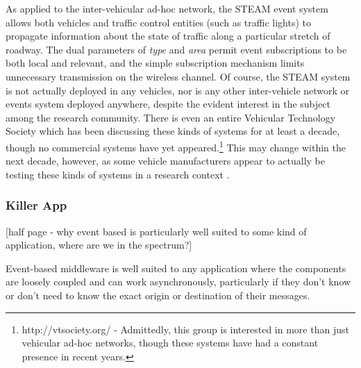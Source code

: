 \documentclass{acm_proc_article-sp}
\begin{document}
As applied to the inter-vehicular ad-hoc network, the STEAM event system allows both vehicles and traffic control entities (such as traffic lights) to propagate information about the state of traffic along a particular stretch of roadway. The dual parameters of {\em type} and {\em area} permit event subscriptions to be both local and relevant, and the simple subscription mechanism limits unnecessary transmission on the wireless channel. Of course, the STEAM system is not actually deployed in any vehicles, nor is any other inter-vehicle network or events system deployed anywhere, despite the evident interest in the subject among the research community. There is even an entire Vehicular Technology Society which has been discussing these kinds of systems for at least a decade, though no commercial systems have yet appeared.\footnote{http://vtsociety.org/ - Admittedly, this group is interested in more than just vehicular ad-hoc networks, though these systems have had a constant presence in recent years.} This may change within the next decade, however, as some vehicle manufacturers appear to actually be testing these kinds of systems in a research context \cite{ford}.




\subsubsection{Killer App}

[half page - why event based is particularly well suited to some kind of application, where are we in the spectrum?]

Event-based middleware is well suited to any application where the components are loosely coupled and can work asynchronously, particularly if they don't know or don't need to know the exact origin or destination of their messages.
\end{document}
